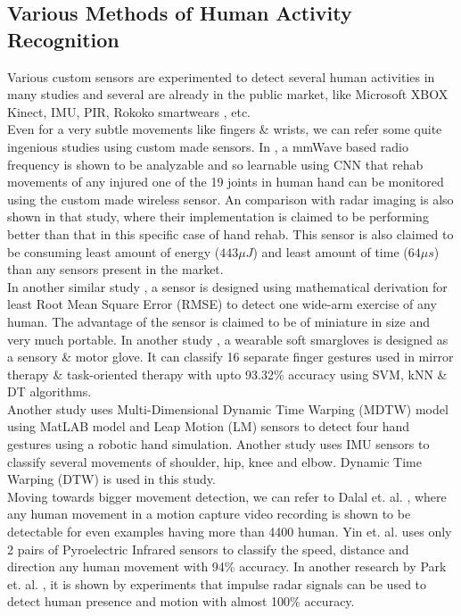 \documentclass[conference]{IEEEtran}
\begin{document}
\subsection[iia]{Various Methods of Human Activity Recognition}
\label{har_sensors}
Various custom sensors are experimented to detect several human activities in many studies and several are already in the public market, like Microsoft XBOX Kinect, IMU, PIR, Rokoko smartwears \cite{rokoko_link}, etc.\\
Even for a very subtle movements like fingers \& wrists, we can refer some quite ingenious studies using custom made sensors. In \cite{mmWave_rf_vs_kinect_radar_img}, a mmWave based radio frequency is shown to be analyzable and so learnable using CNN that rehab movements of any injured one of the 19 joints in human hand can be monitored using the custom made wireless sensor. An comparison with radar imaging is also shown in that study, where their implementation is claimed to be performing better than that in this specific case of hand rehab. This sensor is also claimed to be consuming least amount of energy ($443\mu J$) and least amount of time ($64\mu s$) than any sensors present in the market.\\
In another similar study \cite{math_dervd_hand_pos_sensor}, a sensor is designed using mathematical derivation for least Root Mean Square Error (RMSE) to detect one wide-arm exercise of any human. The advantage of the sensor is claimed to be of miniature in size and very much portable. In another study \cite{wear_handglove}, a wearable soft smargloves is designed as a sensory \& motor glove. It can classify 16 separate finger gestures used in mirror therapy \& task-oriented therapy with upto 93.32\% accuracy using SVM, kNN \& DT algorithms.\\
Another study uses Multi-Dimensional Dynamic Time Warping (MDTW) model using MatLAB model and Leap Motion (LM)\cite{ultraleap} sensors to detect four hand gestures using a robotic hand simulation. Another study \cite{joints_imu} uses IMU sensors to classify several movements of shoulder, hip, knee and elbow. Dynamic Time Warping (DTW) is used in this study.\\
Moving towards bigger movement detection, we can refer to Dalal et. al. \cite{dalal}, where any human movement in a motion capture video recording is shown to be detectable for even examples having more than 4400 human. Yin et. al. \cite{yun_pir} uses only 2 pairs of Pyroelectric Infrared sensors to classify the speed, distance and direction any human movement with 94\% accuracy. In another research by Park et. al. \cite{young_impulse_radar}, it is shown by experiments that impulse radar signals can be used to detect human presence and motion with almost 100\% accuracy.
\end{document}
